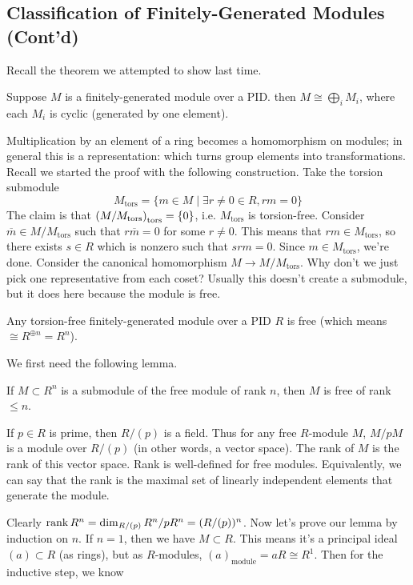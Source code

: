 \subsection{Classification of Finitely-Generated Modules (Cont'd)}
Recall the theorem we attempted to show last time.
\begin{theorem}
    Suppose $M$ is a finitely-generated module over a PID. then $M \cong \bigoplus_i M_i$,
    where each $M_i$ is cyclic (generated by one element).
\end{theorem}
Multiplication by an element of a ring becomes a homomorphism on modules; in general this is a representation: which turns
group elements into transformations. Recall we started the proof with the following construction.
Take the torsion submodule
\[ M_{\text{tors}} = \{m \in M \mid \exists r \neq 0 \in R, rm = 0 \} \]
The claim is that $\qty(M/M_{\text{tors}})_{\text{tors}} = \{0\}$, i.e. $M_{\text{tors}}$ is torsion-free.
Consider $\overline{m} \in M/M_{\text{tors}}$ such that $r \overline{m} = 0$ for some $r \neq 0$.
This means that $rm \in M_{\text{tors}}$, so there exists $s \in R$ which is nonzero such that $srm = 0$.
Since $m \in M_{\text{tors}}$, we're done. Consider the canonical homomorphism $M \to M/M_{\text{tors}}$. Why don't we just pick
one representative from each coset? Usually this doesn't create a submodule, but it does here because the module is free.
\begin{theorem}
Any torsion-free finitely-generated
module over a PID $R$ is free (which means $\cong R^{\oplus n} = R^n$).
\end{theorem}
We first need the following lemma.
\begin{lemma}
    If $M \subset R^n$ is a submodule of the free module of rank $n$, then $M$ is free of rank $\leq n$.
\end{lemma}
\begin{definition}
    If $p \in R$ is prime, then $R/(p)$ is a field. Thus for any free $R$-module $M$, $M/pM$ is a module over $R/(p)$ (in other words,
    a vector space). The rank of $M$ is the rank of this vector space. Rank is well-defined for free modules. Equivalently,
    we can say that the rank is the maximal set of linearly independent elements that generate the module.
\end{definition}
Clearly $\rank R^n = \dim_{R/(p)} R^n/pR^n = (R/(p))^n$. Now let's prove our lemma by induction on $n$.
If $n = 1$, then we have $M \subset R$. This means it's a principal ideal $(a) \subset R$ (as rings), but as $R$-modules,
$(a)_{\text{module}} = aR \cong R^1$. Then for the inductive step, we know
